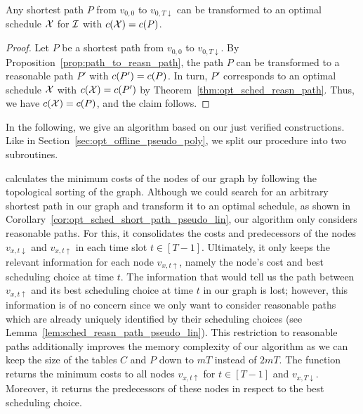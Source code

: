 \begin{cor}\label{cor:opt_sched_short_path_pseudo_lin}
Any shortest path $P$ from $v_{0,0}$ to $v_{0,T\downarrow}$ can be transformed to an optimal schedule $\mathcal{X}$ for $\mathcal{I}$ with $c(\mathcal{X})=c(P)$.
\end{cor}
\begin{proof}
Let $P$ be a shortest path from $v_{0,0}$ to $v_{0,T\downarrow}$. By Proposition~\ref{prop:path_to_reasn_path}, the path $P$ can be transformed to a reasonable path $P'$ with $c(P')=c(P)$.
In turn, $P'$ corresponds to an optimal schedule $\mathcal{X}$ with $c(\mathcal{X})=c(P')$ by Theorem~\ref{thm:opt_sched_reasn_path}. Thus, we have $c(\mathcal{X})=c(P)$, and the claim follows.
\end{proof}
In the following, we give an algorithm based on our just verified constructions. Like in Section~\ref{sec:opt_offline_pseudo_poly}, we split our procedure into two subroutines.

 calculates the minimum costs of the nodes of our graph by following the topological sorting of the graph. Although we could search for an arbitrary shortest path in our graph and transform it to an optimal schedule, as shown in Corollary~\ref{cor:opt_sched_short_path_pseudo_lin}, our algorithm only considers reasonable paths. 
For this, it consolidates the costs and predecessors of the nodes $v_{x,t\downarrow}$ and $v_{x,t\uparrow}$ in each time slot $t\in[T-1]$. Ultimately, it only keeps the relevant information for each node $v_{x,t\uparrow}$, namely the node's cost and best scheduling choice at time $t$. The information that would tell us the path between $v_{x,t\uparrow}$ and its best scheduling choice at time $t$ in our graph is lost; however, this information is of no concern since we only want to consider reasonable paths which are already uniquely identified by their scheduling choices (see Lemma~\ref{lem:sched_reasn_path_pseudo_lin}). This restriction to reasonable paths additionally improves the memory complexity of our algorithm as we can keep the size of the tables $C$ and $P$ down to $mT$ instead of $2mT$. The function returns the minimum costs to all nodes $v_{x,t\uparrow}$ for $t\in[T-1]$ and $v_{x,T\downarrow}$. Moreover, it returns the predecessors of these nodes in respect to the best scheduling choice.

